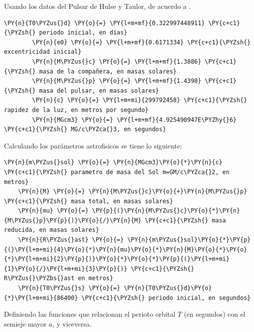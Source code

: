     Usando los datos del Pulsar de Hulse y Taulor, de acuerdo a \cite{Weisberg2010}.
    \begin{tcolorbox}[breakable, size=fbox, boxrule=1pt, pad at break*=1mm,colback=cellbackground, colframe=cellborder]
        \begin{Verbatim}[commandchars=\\\{\}]
        \PY{n}{T0\PYZus{}d} \PY{o}{=} \PY{l+m+mf}{0.322997448911} \PY{c+c1}{\PYZsh{} periodo inicial, en días}
        \PY{n}{e0} \PY{o}{=} \PY{l+m+mf}{0.6171334} \PY{c+c1}{\PYZsh{} excentricidad inicial}
        \PY{n}{M\PYZus{}c} \PY{o}{=} \PY{l+m+mf}{1.3886} \PY{c+c1}{\PYZsh{} masa de la compañera, en masas solares}
        \PY{n}{M\PYZus{}p} \PY{o}{=} \PY{l+m+mf}{1.4398} \PY{c+c1}{\PYZsh{} masa del pulsar, en masas solares}
        \PY{n}{c} \PY{o}{=} \PY{l+m+mi}{299792458} \PY{c+c1}{\PYZsh{} rapidez de la luz, en metros por segundo}
        \PY{n}{MGcm3} \PY{o}{=} \PY{l+m+mf}{4.925490947E\PYZhy{}6} \PY{c+c1}{\PYZsh{} MG/c\PYZca{}3, en segundos}
        \end{Verbatim}
        \end{tcolorbox}
Calculando los parámetros astrofisicos se tiene lo siguiente:
\begin{tcolorbox}[breakable, size=fbox, boxrule=1pt, pad at break*=1mm,colback=cellbackground, colframe=cellborder]
    \begin{Verbatim}[commandchars=\\\{\}]
    \PY{n}{m\PYZus{}sol} \PY{o}{=} \PY{n}{MGcm3}\PY{o}{*}\PY{n}{c} \PY{c+c1}{\PYZsh{} parametro de masa del Sol m=GM/c\PYZca{}2, en metros}
    \PY{n}{M} \PY{o}{=} \PY{n}{M\PYZus{}c}\PY{o}{+}\PY{n}{M\PYZus{}p} \PY{c+c1}{\PYZsh{} masa total, en masas solares}
    \PY{n}{mu} \PY{o}{=} \PY{p}{(}\PY{n}{M\PYZus{}c}\PY{o}{*}\PY{n}{M\PYZus{}p}\PY{p}{)}\PY{o}{/}\PY{n}{M} \PY{c+c1}{\PYZsh{} masa reducida, en masas solares}
    \PY{n}{R\PYZus{}ast} \PY{o}{=} \PY{n}{m\PYZus{}sol}\PY{o}{*}\PY{p}{(}\PY{l+m+mi}{4}\PY{o}{*}\PY{n}{mu}\PY{o}{*}\PY{n}{M}\PY{o}{*}\PY{o}{*}\PY{l+m+mi}{2}\PY{p}{)}\PY{o}{*}\PY{o}{*}\PY{p}{(}\PY{l+m+mi}{1}\PY{o}{/}\PY{l+m+mi}{3}\PY{p}{)} \PY{c+c1}{\PYZsh{} R\PYZus{}\PYZbs{}ast en metros}
    \PY{n}{T0\PYZus{}s} \PY{o}{=} \PY{n}{T0\PYZus{}d}\PY{o}{*}\PY{l+m+mi}{86400} \PY{c+c1}{\PYZsh{} periodo inicial, en segundos}
    \end{Verbatim}
    \end{tcolorbox}
Definiendo las funciones que relacionan el perioto orbital $T$ (en segundos) con el semieje mayor $a$, y viceversa.
